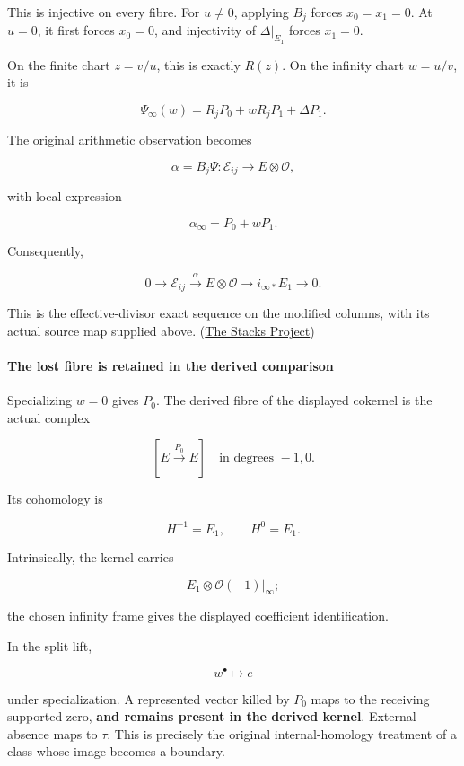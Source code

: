 This is injective on every fibre. For \(u\ne0\), applying \(B_j\) forces \(x_0=x_1=0\). At \(u=0\), it first forces \(x_0=0\), and injectivity of \(\Delta|_{E_1}\) forces \(x_1=0\).

On the finite chart \(z=v/u\), this is exactly \(R(z)\). On the infinity chart \(w=u/v\), it is

\[
\boxed{
\Psi_\infty(w)
=
R_jP_0+wR_jP_1+\Delta P_1.
}
\]

The original arithmetic observation becomes

\[
\alpha=B_j\Psi:\mathscr E_{ij}\longrightarrow E\otimes\mathcal O,
\]

with local expression

\[
\boxed{\alpha_\infty=P_0+wP_1.}
\]

Consequently,

\[
\boxed{
0\longrightarrow\mathscr E_{ij}
\xrightarrow{\alpha}
E\otimes\mathcal O
\longrightarrow i_{\infty*}E_1
\longrightarrow0.
}
\]

This is the effective-divisor exact sequence on the modified columns, with its actual source map supplied above. (\href{https://stacks.math.columbia.edu/tag/0C6K}{The Stacks Project})

\paragraph{The lost fibre is retained in the derived comparison}\label{endpoint-curvature_original--the-lost-fibre-is-retained-in-the-derived-comparison}

Specializing \(w=0\) gives \(P_0\). The derived fibre of the displayed cokernel is the actual complex

\[
\boxed{
[E\xrightarrow{P_0}E]
\quad\text{in degrees }-1,0.
}
\]

Its cohomology is

\[
\boxed{H^{-1}=E_1,\qquad H^0=E_1.}
\]

Intrinsically, the kernel carries

\[
E_1\otimes\mathcal O(-1)|_\infty;
\]

the chosen infinity frame gives the displayed coefficient identification.

In the split lift,

\[
w^\bullet\longmapsto e
\]

under specialization. A represented vector killed by \(P_0\) maps to the receiving supported zero, \textbf{and remains present in the derived kernel}. External absence maps to \(\tau\). This is precisely the original internal-homology treatment of a class whose image becomes a boundary.


